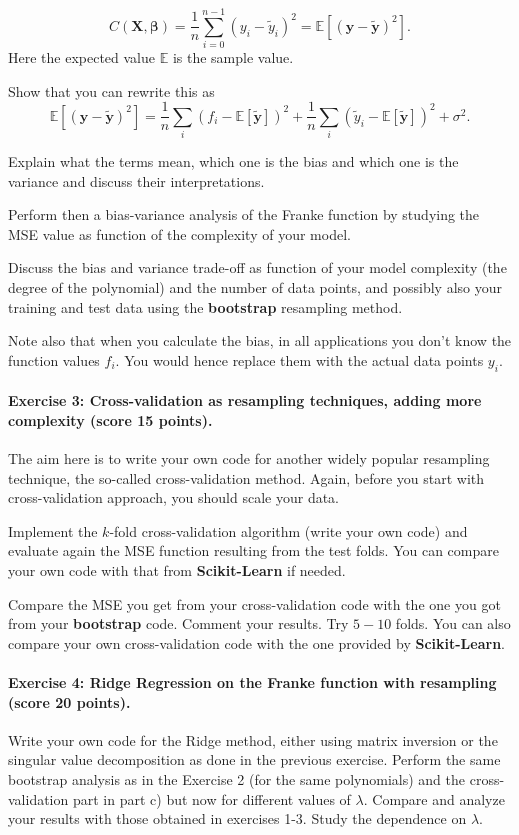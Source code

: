 \documentclass[%
oneside,                 %
final,                   %
10pt]{article}
\begin{document}
\[
C(\bm{X},\bm{\beta}) =\frac{1}{n}\sum_{i=0}^{n-1}(y_i-\tilde{y}_i)^2=\mathbb{E}\left[(\bm{y}-\bm{\tilde{y}})^2\right].
\]
Here the expected value $\mathbb{E}$ is the sample value. 

Show that you can rewrite  this as
\[
\mathbb{E}\left[(\bm{y}-\bm{\tilde{y}})^2\right]=\frac{1}{n}\sum_i(f_i-\mathbb{E}\left[\bm{\tilde{y}}\right])^2+\frac{1}{n}\sum_i(\tilde{y}_i-\mathbb{E}\left[\bm{\tilde{y}}\right])^2+\sigma^2.
\]

Explain what the terms mean, which one is the bias and which one is
the variance and discuss their interpretations.

Perform then a bias-variance analysis of the Franke function by
studying the MSE value as function of the complexity of your model.

Discuss the bias and variance trade-off as function
of your model complexity (the degree of the polynomial) and the number
of data points, and possibly also your training and test data using the \textbf{bootstrap} resampling method.

Note also that when you calculate the bias, in all applications you don't know the function values $f_i$. You would hence replace them with the actual data points $y_i$.


\paragraph{Exercise 3:  Cross-validation as resampling techniques, adding more complexity (score 15 points).}
The aim here is to write your own code for another widely popular
resampling technique, the so-called cross-validation method.  Again,
before you start with cross-validation approach, you should scale your
data.

Implement the $k$-fold cross-validation algorithm (write your own
code) and evaluate again the MSE function resulting
from the test folds. You can compare your own code with that from
\textbf{Scikit-Learn} if needed. 

Compare the MSE you get from your cross-validation code with the one
you got from your \textbf{bootstrap} code. Comment your results. Try $5-10$
folds.  You can also compare your own cross-validation code with the
one provided by \textbf{Scikit-Learn}.


\paragraph{Exercise 4: Ridge Regression on the Franke function  with resampling (score 20 points).}
Write your own code for the Ridge method, either using matrix
inversion or the singular value decomposition as done in the previous
exercise. Perform the same bootstrap analysis as in the
Exercise 2  (for the same polynomials) and the cross-validation part in part c) but now for different values of $\lambda$. Compare and
analyze your results with those obtained in exercises 1-3. Study the
dependence on $\lambda$.
\end{document}
